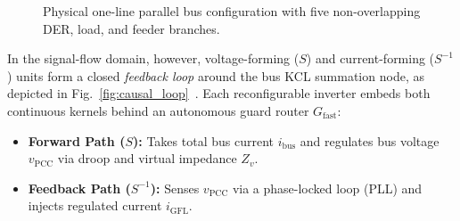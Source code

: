 \documentclass[journal]{IEEEtran}
\begin{document}
\begin{figure}[t]
{%
}
\caption{Physical one-line parallel bus configuration with five non-overlapping DER, load, and feeder branches.}
\label{fig:one_line}
\end{figure}

In the signal-flow domain, however, voltage-forming ($S$) and current-forming ($S^{-1}$) units form a closed \emph{feedback loop} around the bus KCL summation node, as depicted in Fig.~\ref{fig:causal_loop}~\cite{Li2022Duality}. Each reconfigurable inverter embeds both continuous kernels behind an autonomous guard router $G_{\mathrm{fast}}$:
\begin{itemize}
    \item \textbf{Forward Path ($S$):} Takes total bus current $i_{\mathrm{bus}}$ and regulates bus voltage $v_{\mathrm{PCC}}$ via droop and virtual impedance $Z_v$.
    \item \textbf{Feedback Path ($S^{-1}$):} Senses $v_{\mathrm{PCC}}$ via a phase-locked loop (PLL) and injects regulated current $i_{\mathrm{GFL}}$.
\end{itemize}
\end{document}
